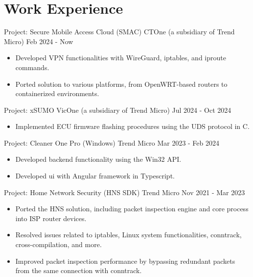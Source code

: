 \section{Work Experience}
{Project: Secure Mobile Access Cloud (SMAC)}
{CTOne (a subsidiary of Trend Micro)}
{Feb 2024 - Now}
\begin{itemize}
  \setlength\topsep{0em}
  \setlength\parskip{0em}
  \setlength\parsep{0em}
  \setlength\itemsep{0em}
  \item Developed VPN functionalities with WireGuard, iptables, and iproute commands.
  \item Ported solution to various platforms, from OpenWRT-based routers to containerized environments.
\end{itemize}

{Project: xSUMO}
{VicOne (a subsidiary of Trend Micro)}
{Jul 2024 - Oct 2024}
\begin{itemize}
  \setlength\topsep{0em}
  \setlength\parskip{0em}
  \setlength\parsep{0em}
  \setlength\itemsep{0em}
  \item Implemented ECU firmware flashing procedures using the UDS protocol in C.
\end{itemize}

{Project: Cleaner One Pro (Windows)}
{Trend Micro}
{Mar 2023 - Feb 2024}
\begin{itemize}
  \setlength\topsep{0em}
  \setlength\parskip{0em}
  \setlength\parsep{0em}
  \setlength\itemsep{0em}
  \item Developed backend functionality using the Win32 API.
  \item Developed ui with Angular framework in Typescript.
\end{itemize}

{Project: Home Network Security (HNS SDK)}
{Trend Micro}
{Nov 2021 - Mar 2023}
\begin{itemize}
  \setlength\topsep{0em}
  \setlength\parskip{0em}
  \setlength\parsep{0em}
  \setlength\itemsep{0em}
  \item Ported the HNS solution, including packet inspection engine and core process into ISP router devices. 
  \item Resolved issues related to iptables, Linux system functionalities, conntrack, cross-compilation, and more.
  \item Improved packet inspection performance by bypassing redundant packets from the same connection with conntrack.
\end{itemize}

